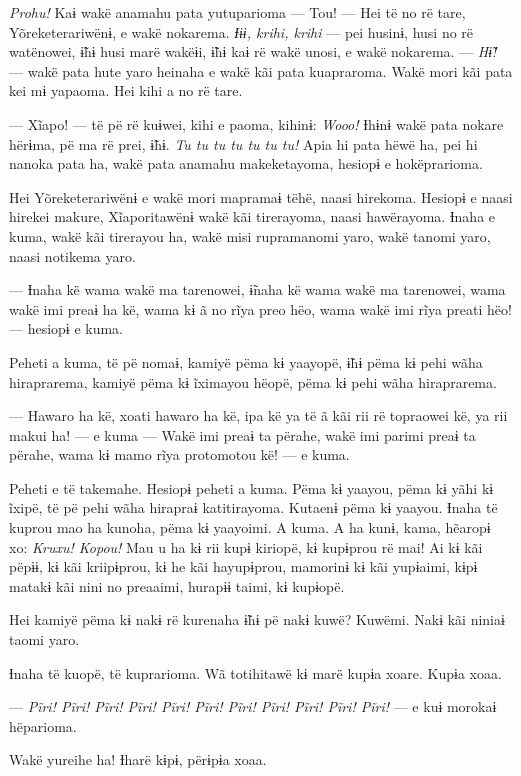 \textit{Prohu!} Kaɨ wakë anamahu pata yutuparioma --- Tou! --- Hei të no rë tare,
Yõreketerariwënɨ, e wakë nokarema. \textit{Ɨɨɨ, krihi, krihi} --- pei husinɨ,
husi no rë watënowei, ɨ̃hɨ husi marë wakëɨi, ɨ̃hɨ kaɨ rë wakë unosi, e wakë
nokarema. --- \textit{Hɨ̃!} --- wakë pata hute yaro heinaha e wakë kãi pata
kuapraroma. Wakë mori kãi pata kei mɨ yapaoma. Hei kihi a no rë tare. 

--- Xĩapo! --- të pë rë kuɨwei, kihi e paoma, kihinɨ: \textit{Wooo!} Ɨhɨnɨ wakë
pata nokare hërɨma, pë ma rë prei, ɨ̃hɨ. \textit{Tu tu tu tu tu tu tu!} Apia hi
pata hëwë ha, pei hi nanoka pata ha, wakë pata anamahu makeketayoma,
hesiopɨ e hokëprarioma. 

Hei Yõreketerariwënɨ e wakë mori mapramaɨ tëhë, naasi hirekoma. Hesiopɨ
e naasi hirekei makure, Xĩaporitawënɨ wakë kãi tirerayoma, naasi
hawërayoma. Ɨnaha e kuma, wakë kãi tirerayou ha, wakë misi rupramanomi
yaro, wakë tanomi yaro, naasi notikema yaro. 

--- Ɨnaha kë wama wakë ma tarenowei, ɨ̃naha kë wama wakë ma tarenowei,
wama wakë imi preaɨ ha kë, wama kɨ ã no rĩya preo hëo, wama wakë imi
rĩya preati hëo! --- hesiopɨ e kuma. 

Peheti a kuma, të pë nomaɨ, kamiyë pëma kɨ yaayopë, ɨ̃hɨ pëma kɨ pehi
wãha hiraprarema, kamiyë pëma kɨ ĩximayou hëopë, pëma kɨ pehi wãha
hiraprarema. 

--- Hawaro ha kë, xoati hawaro ha kë, ipa kë ya të ã kãi rii rë
topraowei kë, ya rii makui ha! --- e kuma --- Wakë imi preaɨ ta përahe,
wakë imi parimi preaɨ ta përahe, wama kɨ mamo rĩya protomotou kë! --- e
kuma. 

Peheti e të takemahe. Hesiopɨ peheti a kuma. Pëma kɨ yaayou, pëma kɨ
yãhi kɨ ĩxipë, të pë pehi wãha hirapraɨ katitirayoma. Kutaenɨ pëma kɨ
yaayou. Ɨnaha të kuprou mao ha kunoha, pëma kɨ yaayoimi. A kuma. A ha
kunɨ, kama, hẽaropɨ xo: \textit{Kruxu! Kopou!} Mau u ha kɨ rii kupɨ kiriopë, kɨ
kupɨprou rë mai! Ai kɨ kãi pëpɨɨ, kɨ kãi kriipɨprou, kɨ he kãi
hayupɨprou, mamorinɨ kɨ kãi yupɨaimi, kɨpɨ matakɨ kãi nini no preaaimi,
hurapɨɨ taimi, kɨ kupɨopë. 

Hei kamiyë pëma kɨ nakɨ rë kurenaha ɨ̃hɨ pë nakɨ kuwë? Kuwëmi. Nakɨ kãi
niniaɨ taomi yaro. 

Ɨnaha të kuopë, të kuprarioma. Wã totihitawë kɨ marë kupɨa xoare. Kupɨa
xoaa. 

--- \textit{Pĩri! Pĩri! Pĩri! Pĩri! Pĩri! Pĩri! Pĩri! Pĩri! Pĩri! Pĩri! Pĩri!}
--- e kuɨ morokaɨ hëparioma. 

Wakë yureihe ha! Ɨharë kɨpɨ, përɨpɨa xoaa. 

